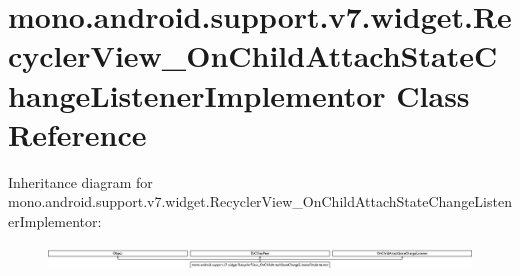 \hypertarget{classmono_1_1android_1_1support_1_1v7_1_1widget_1_1_recycler_view___on_child_attach_state_change_listener_implementor}{}\section{mono.\+android.\+support.\+v7.\+widget.\+Recycler\+View\+\_\+\+On\+Child\+Attach\+State\+Change\+Listener\+Implementor Class Reference}
\label{classmono_1_1android_1_1support_1_1v7_1_1widget_1_1_recycler_view___on_child_attach_state_change_listener_implementor}
Inheritance diagram for mono.\+android.\+support.\+v7.\+widget.\+Recycler\+View\+\_\+\+On\+Child\+Attach\+State\+Change\+Listener\+Implementor\+:\begin{figure}[H]
\begin{center}
\leavevmode
\includegraphics[height=0.670257cm]{classmono_1_1android_1_1support_1_1v7_1_1widget_1_1_recycler_view___on_child_attach_state_change_listener_implementor}
\end{center}
\end{figure}

